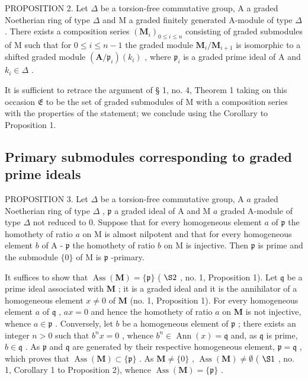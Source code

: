 PROPOSITION 2. Let \(\Delta\) be a torsion-free commutative group, A a graded Noetherian ring of type \(\Delta\) and M a graded finitely generated A-module of type \(\Delta\) . There exists a composition series \((\mathbf{M}_i)_{0 \leqslant i \leqslant n}\) consisting of graded submodules of M such that for \(0 \leqslant i \leqslant n - 1\) the graded module \(\mathbf{M}_i / \mathbf{M}_{i+1}\) is isomorphic to a shifted graded module \((\mathbf{A} / \mathfrak{p}_i)(k_i)\) , where \(\mathfrak{p}_i\) is a graded prime ideal of A and \(k_i \in \Delta\) .

It is sufficient to retrace the argument of § 1, no. 4, Theorem 1 taking on this occasion \(\mathfrak{E}\) to be the set of graded submodules of M with a composition series with the properties of the statement; we conclude using the Corollary to Proposition 1.

\subsection{Primary submodules corresponding to graded prime ideals}

PROPOSITION 3. Let \(\Delta\) be a torsion-free commutative group, A \(a\) graded Noetherian ring of type \(\Delta\) , \(\mathfrak{p}\) a graded ideal of A and M \(a\) graded A-module of type \(\Delta\) not reduced to 0. Suppose that for every homogeneous element \(a\) of \(\mathfrak{p}\) the homothety of ratio \(a\) on M is almost nilpotent and that for every homogeneous element \(b\) of A - \(\mathfrak{p}\) the homothety of ratio \(b\) on M is injective. Then \(\mathfrak{p}\) is prime and the submodule \(\{0\}\) of M is \(\mathfrak{p}\) -primary.

It suffices to show that \(\operatorname{Ass}(\mathbf{M}) = \{\mathfrak{p}\}\) ( \(\S 2\) , no. 1, Proposition 1). Let \(\mathfrak{q}\) be a prime ideal associated with \(\mathbf{M}\) ; it is a graded ideal and it is the annihilator of a homogeneous element \(x \neq 0\) of \(\mathbf{M}\) (no. 1, Proposition 1). For every homogeneous element \(a\) of \(\mathfrak{q}\) , \(ax = 0\) and hence the homothety of ratio \(a\) on \(\mathbf{M}\) is not injective, whence \(a \in \mathfrak{p}\) . Conversely, let \(b\) be a homogeneous element of \(\mathfrak{p}\) ; there exists an integer \(n > 0\) such that \(b^n x = 0\) , whence \(b^n \in \operatorname{Ann}(x) = \mathfrak{q}\) and, as \(\mathfrak{q}\) is prime, \(b \in \mathfrak{q}\) . As \(\mathfrak{p}\) and \(\mathfrak{q}\) are generated by their respective homogeneous element, \(\mathfrak{p} = \mathfrak{q}\) , which proves that \(\operatorname{Ass}(\mathbf{M}) \subset \{\mathfrak{p}\}\) . As \(\mathbf{M} \neq \{0\}\) , \(\operatorname{Ass}(\mathbf{M}) \neq \emptyset\) ( \(\S 1\) , no. 1, Corollary 1 to Proposition 2), whence \(\operatorname{Ass}(\mathbf{M}) = \{\mathfrak{p}\}\) .

